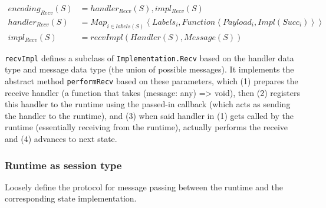 \documentclass{article}
\begin{document}
\begin{align}
encoding_{Recv}(S) &= handler_{Recv}(S), impl_{Recv}(S) \\
handler_{Recv}(S) &= Map_{i \in labels(S)}\left<Labels_i, Function\left<Payload_i, Impl(Succ_i)\right>\right> \\
impl_{Recv}(S) &= recvImpl(Handler(S), Message(S))
\end{align}

\texttt{recvImpl} defines a subclass of \texttt{Implementation.Recv} based on the handler data type
and message data type (the union of possible messages). It implements the abstract method
\texttt{performRecv} based on these parameters, which (1) prepares the receive handler (a function that takes
(message: any) => void), then (2) registers this handler to the runtime using the passed-in callback
(which acts as sending the handler to the runtime), and (3) when said handler in (1) gets called by the runtime
(essentially receiving from the runtime), actually performs the receive and (4) advances to next state.

\subsubsection{Runtime as session type}
Loosely define the protocol for message passing between the runtime and the
corresponding state implementation.
\end{document}
